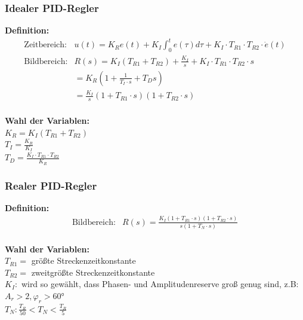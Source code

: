 \documentclass[10pt,a4paper]{article}
\begin{document}
\subsubsection{Idealer PID-Regler}
\textbf{Definition:}
$$
	\begin{array}{ll}
	\text{Zeitbereich:} & u(t) = K_R e(t) + K_I \int_0^t e(\tau) d\tau + K_I ⋅ T_{R1} ⋅ T_{R2} ⋅ \dot e(t)\\
	\text{Bildbereich:} & R(s) = K_I(T_{R1} + T_{R2}) + \frac{K_I}{s} + K_I ⋅ T_{R1} ⋅ T_{R2} ⋅ s \\
	& = K_R(1 + \frac{1}{T_I ⋅ s} + T_D s) \\
	& = \frac{K_I}{s}(1 + T_{R1} ⋅ s)(1 + T_{R2} ⋅ s)
	\end{array}
$$ \\


\textbf{Wahl der Variablen:} \\
$K_R = K_I(T_{R1} + T_{R2})$  \\
$T_I = \frac{K_R}{K_I}$ \\
$T_D = \frac{K_I ⋅ T_{R1} ⋅ T_{R2}}{K_R}$ \\


\subsubsection{Realer PID-Regler}
\textbf{Definition:}
$$
	\begin{array}{ll}
	\text{Bildbereich:} & R(s) = \frac{K_I(1 + T_{R1} ⋅ s)(1 + T_{R2} ⋅ s)}{s(1 + T_N ⋅ s)}
	\end{array}
$$ \\

\textbf{Wahl der Variablen:} \\
$T_{R1} =$ größte Streckenzeitkonstante  \\
$T_{R2} =$ zweitgrößte Streckenzeitkonstante \\
$K_I:$ wird so gewählt, dass Phasen- und Amplitudenreserve groß genug sind, z.B: $A_r > 2, \varphi_r > 60°$ \\
$T_N: \frac{T_R}{50} < T_N < \frac{T_R}{5}$ \\
\end{document}
